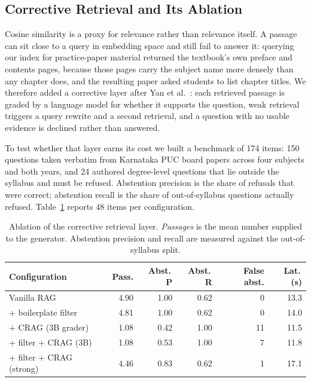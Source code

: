 \documentclass[conference]{IEEEtran}
\begin{document}
\subsection{Corrective Retrieval and Its Ablation}
Cosine similarity is a proxy for relevance rather than relevance itself.
A passage can sit close to a query in embedding space and still fail to
answer it: querying our index for practice-paper material returned the
textbook's own preface and contents pages, because those pages carry the
subject name more densely than any chapter does, and the resulting paper
asked students to list chapter titles. We therefore added a corrective
layer after Yan et al.~\cite{yan2024crag}: each retrieved passage is
graded by a language model for whether it supports the question, weak
retrieval triggers a query rewrite and a second retrieval, and a question
with no usable evidence is declined rather than answered.

To test whether that layer earns its cost we built a benchmark of 174
items: 150 questions taken verbatim from Karnataka PUC board papers
across four subjects and both years, and 24 authored degree-level
questions that lie outside the syllabus and must be refused. Abstention
precision is the share of refusals that were correct; abstention recall
is the share of out-of-syllabus questions actually refused. Table~\ref{tab:ablation}
reports 48 items per configuration.

\begin{table}[htbp]
\caption{Ablation of the corrective retrieval layer. \emph{Passages} is
the mean number supplied to the generator. Abstention precision and
recall are measured against the out-of-syllabus split.}
\label{tab:ablation}
\centering
\begin{tabular}{lrrrrr}
\toprule
Configuration & Pass. & Abst.\,P & Abst.\,R & False abst. & Lat.\,(s) \\
\midrule
Vanilla RAG                  & 4.90 & 1.00 & 0.62 & 0  & 13.3 \\
+ boilerplate filter         & 4.81 & 1.00 & 0.62 & 0  & 14.0 \\
+ CRAG (3B grader)           & 1.08 & 0.42 & 1.00 & 11 & 11.5 \\
+ filter + CRAG (3B)         & 1.08 & 0.53 & 1.00 & 7  & 11.8 \\
+ filter + CRAG (strong)     & 4.46 & 0.83 & 0.62 & 1  & 17.1 \\
\bottomrule
\end{tabular}
\end{table}
\end{document}
